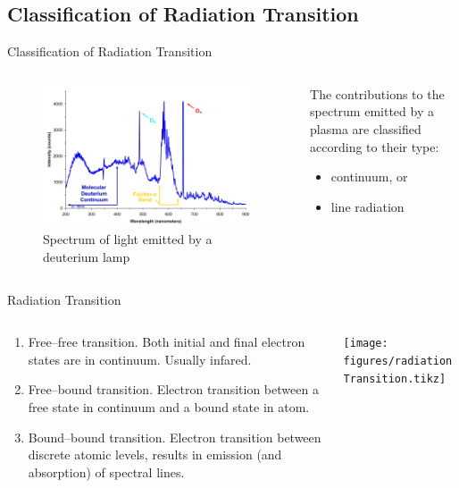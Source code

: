 \documentclass[]{beamer}
\begin{document}
\subsection{Classification of Radiation Transition}
\begin{frame}{Classification of Radiation Transition}
  \begin{columns}%
  \begin{column}{0.6\textwidth}
  \begin{figure}
    \includegraphics[width=\textwidth]{figures/Deuterium_lamp_1.png} 
    \caption{Spectrum of light emitted by a deuterium lamp}
  \end{figure}
  \end{column}  
  \begin{column}{0.4\textwidth}
  The contributions to the spectrum emitted by a plasma are classified according to their type:
  \begin{itemize}
    \item continuum, or
    \item line radiation
  \end{itemize}
  \end{column}
  \end{columns}
\end{frame}
\begin{frame}{Radiation Transition}
  \begin{columns}%
  \begin{column}{0.6\textwidth}
  \begin{enumerate}
    \item Free--free transition. Both initial and final electron states are in continuum. Usually infared.
    \item Free--bound transition. Electron transition between a free state in continuum and a bound state in atom.
    \item Bound--bound transition. Electron transition between discrete atomic levels, results in emission (and absorption) of spectral lines.
  \end{enumerate}
  \end{column}
  \begin{column}{0.4\textwidth}
  \texttt{[image: figures/radiationTransition.tikz]}
  \end{column}
  \end{columns}
\end{frame}
\end{document}
